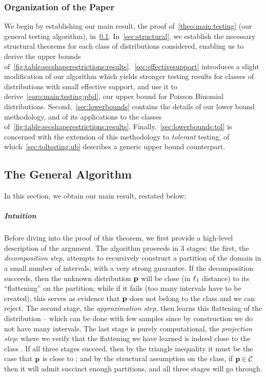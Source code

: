 \subsubsection{Organization of the Paper}
We begin by establishing our main result, the proof of~\cref{theo:main:testing} (our general testing algorithm), in~\cref{sec:algorithm}. 
In~\cref{sec:structural}, we establish the necessary structural theorems for each class of distributions considered, enabling us to derive the upper bounds of~\cref{fig:table:secshaperestrictions:results}.~\cref{sec:effectivesupport} introduces a slight modification of our algorithm which yields stronger testing results for classes of distributions with small effective support, and use it to derive~\cref{coro:main:testing:pbd}, our upper bound for Poisson Binomial distributions. Second,~\cref{sec:lowerbounds} contains the details of our lower bound methodology, and of its applications to the classes of~\cref{fig:table:secshaperestrictions:results}. Finally,~\cref{sec:lowerbounds:tol} is concerned with the extension of this methodology to \emph{tolerant} testing, of which~\cref{sec:toltesting:ub} describes a generic upper bound counterpart.
 

\subsection{The General Algorithm}\label{sec:algorithm}
In this section, we obtain our main result, restated below:
\mainthmtestingalgo*

\subparagraph{Intuition} Before diving into the proof of this theorem, we first provide a high-level description of the argument. The algorithm proceeds in 3 stages: the first, the \emph{decomposition step}, attempts to recursively construct a partition of the domain in a small number of intervals, with a very strong guarantee. If the decomposition succeeds, then the unknown distribution $\D$ will be close (in $\lp[1]$ distance) to its ``flattening'' on the partition; while if it fails (too many intervals have to be created), this serves as evidence that $\D$ does not belong to the class and we can reject. The second stage, the \emph{approximation step}, then learns this flattening of the distribution -- which can be done with few samples since by construction we do not have many intervals. The last stage is purely computational, the \emph{projection step}: where we verify that the flattening we have learned is indeed close to the class \class. If all three stages succeed, then by the triangle inequality it must be the case that $\D$ is close to \class; and by the structural assumption on the class, if $\D\in\class$ then it will admit succinct enough partitions, and all three stages will go through.\medskip

